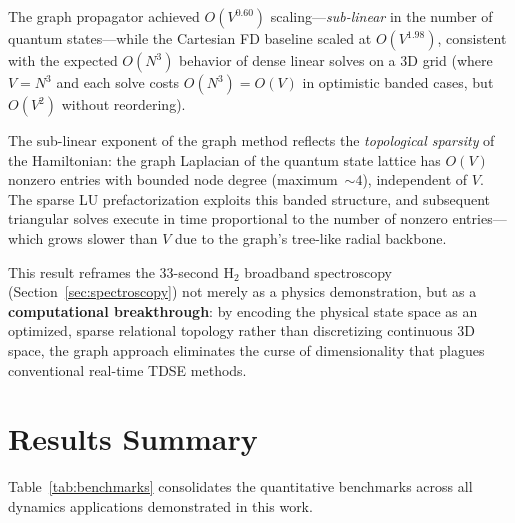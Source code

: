 \documentclass[aps,pra,twocolumn,superscriptaddress,longbibliography,floatfix]{revtex4-2}
\begin{document}
The graph propagator achieved $O(V^{0.60})$ scaling---\emph{sub-linear}
in the number of quantum states---while the Cartesian FD baseline
scaled at $O(V^{1.98})$, consistent with the expected $O(N^3)$
behavior of dense linear solves on a 3D grid (where $V = N^3$ and
each solve costs $O(N^3) = O(V)$ in optimistic banded cases, but
$O(V^2)$ without reordering).

The sub-linear exponent of the graph method reflects the
\emph{topological sparsity} of the Hamiltonian: the graph Laplacian
of the quantum state lattice has $O(V)$ nonzero entries with bounded
node degree (maximum~$\sim 4$), independent of $V$. The sparse LU
prefactorization exploits this banded structure, and subsequent
triangular solves execute in time proportional to the number of
nonzero entries---which grows slower than $V$ due to the graph's
tree-like radial backbone.

This result reframes the 33-second H$_2$ broadband spectroscopy
(Section~\ref{sec:spectroscopy}) not merely as a physics
demonstration, but as a \textbf{computational breakthrough}: by
encoding the physical state space as an optimized, sparse relational
topology rather than discretizing continuous 3D space, the graph
approach eliminates the curse of dimensionality that plagues
conventional real-time TDSE methods.

\section{Results Summary}
\label{sec:results}

Table~\ref{tab:benchmarks} consolidates the quantitative benchmarks
across all dynamics applications demonstrated in this work.
\end{document}
